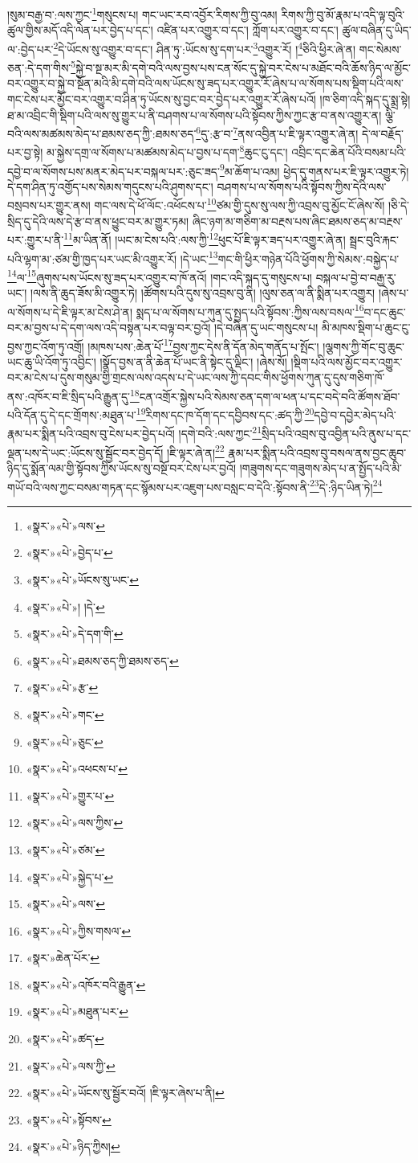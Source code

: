།སུམ་བརྒྱ་བ་:ལས་ཀྱང་\footnote{«སྣར་»«པེ་»ལས་}གསུངས་པ། གང་ཡང་རབ་འབྱོར་རིགས་ཀྱི་བུ་འམ། རིགས་ཀྱི་བུ་མོ་རྣམ་པ་འདི་ལྟ་བུའི་ཚུལ་གྱིས་མདོ་འདི་ལེན་པར་བྱེད་པ་དང་། འཛིན་པར་འགྱུར་བ་དང་། ཀློག་པར་འགྱུར་བ་དང་། ཚུལ་བཞིན་དུ་ཡིད་ལ་:བྱེད་པར་\footnote{«སྣར་»«པེ་»བྱེད་པ་}དེ་ཡོངས་སུ་འགྱུར་བ་དང་། ཤིན་ཏུ་:ཡོངས་སུ་དག་པར་\footnote{«སྣར་»«པེ་»ཡོངས་སུ་ཡང་}འགྱུར་རོ། །\footnote{«སྣར་»«པེ་»། །དེ་}ཅིའི་ཕྱིར་ཞེ་ན། གང་སེམས་ཅན་:དེ་དག་གིས་\footnote{«སྣར་»«པེ་»དེ་དག་གི་}སྐྱེ་བ་སྔ་མར་མི་དགེ་བའི་ལས་བྱས་པས་ངན་སོང་དུ་སྐྱེ་བར་ངེས་པ་མཐོང་བའི་ཆོས་ཉིད་ལ་མྱོང་བར་འགྱུར་བ་སྐྱེ་བ་སྔོན་མའི་མི་དགེ་བའི་ལས་ཡོངས་སུ་ཟད་པར་འགྱུར་རོ་ཞེས་པ་ལ་སོགས་པས་སྡིག་པའི་ལས་གང་ངེས་པར་མྱོང་བར་འགྱུར་བ་ཤིན་ཏུ་ཡོངས་སུ་བྱང་བར་བྱེད་པར་འགྱུར་རོ་ཞེས་པའོ། །ཁ་ཅིག་འདི་སྐད་དུ་སྨྲ་སྟེ། ཐ་མ་འབྲིང་གི་སྡིག་པའི་ལས་སུ་གྱུར་པ་ནི་བཤགས་པ་ལ་སོགས་པའི་སྟོབས་ཀྱིས་ཀྱང་རྩ་བ་ནས་འགྱུར་ན། ལྕི་བའི་ལས་མཚམས་མེད་པ་ཐམས་ཅད་ཀྱི་:ཐམས་ཅད་\footnote{«སྣར་»«པེ་»ཐམས་ཅད་ཀྱི་ཐམས་ཅད་}དུ་:རྩ་བ་\footnote{«སྣར་»«པེ་»རྩ་}ནས་འབྱིན་པ་ཇི་ལྟར་འགྱུར་ཞེ་ན། དེ་ལ་བརྗོད་པར་བྱ་སྟེ། མ་སྐྱེས་དགྲ་ལ་སོགས་པ་མཚམས་མེད་པ་བྱས་པ་དག་\footnote{«སྣར་»«པེ་»གང་}ཆུང་ངུ་དང་། འབྲིང་དང་ཆེན་པོའི་བསམ་པའི་དབྱེ་བ་ལ་སོགས་པས་མནར་མེད་པར་བསྐལ་པར་:ཅུང་ཟད་\footnote{«སྣར་»«པེ་»ཅུང་}མ་ཆོག་པ་འམ། ཕྱེད་དུ་གནས་པར་ཇི་ལྟར་འགྱུར་ཏེ། དེ་དག་ཤིན་ཏུ་འགྱོད་པས་སེམས་གདུངས་པའི་ཤུགས་དང་། བཤགས་པ་ལ་སོགས་པའི་སྟོབས་ཀྱིས་དེའི་ལས་བསྲབས་པར་གྱུར་ནས། གང་ལས་དེ་ཕོ་ལོང་:འཕོངས་པ་\footnote{«སྣར་»«པེ་»འཕངས་པ་}ཙམ་གྱི་དུས་སུ་ལས་ཀྱི་འབྲས་བུ་མྱོང་ངོ་ཞེས་སོ། །ཅི་དེ་སྲིད་དུ་དེའི་ལས་དེ་རྩ་བ་ནས་ཕྱུང་བར་མ་གྱུར་ཏམ། ཞིང་ཉག་མ་གཅིག་མ་བརྔས་པས་ཞིང་ཐམས་ཅད་མ་བརྔས་པར་:གྱུར་པ་ནི་\footnote{«སྣར་»«པེ་»གྱུར་པ་}མ་ཡིན་ནོ། །ཡང་མ་ངེས་པའི་:ལས་ཀྱི་\footnote{«སྣར་»«པེ་»ལས་ཀྱིས་}ཕུང་པོ་ཇི་ལྟར་ཟད་པར་འགྱུར་ཞེ་ན། སྦྲང་བུའི་རྐང་པའི་ལྷག་མ་:ཙམ་གྱི་ཁྱད་པར་ཡང་མི་འགྱུར་རོ། །དེ་ཡང་\footnote{«སྣར་»«པེ་»ཙམ་}གང་གི་ཕྱིར་གཉེན་པོའི་ཕྱོགས་ཀྱི་སེམས་:བསྐྱེད་པ་\footnote{«སྣར་»«པེ་»སྐྱེད་པ་}ལ་\footnote{«སྣར་»«པེ་»ལས་}ཞུགས་པས་ཡོངས་སུ་ཟད་པར་འགྱུར་བ་ཁོ་ནའོ། །གང་འདི་སྐད་དུ་གསུངས་པ། བསྐལ་པ་བྱེ་བ་བརྒྱ་རུ་ཡང་། །ལས་ནི་ཆུད་ཟོས་མི་འགྱུར་ཏེ། །ཚོགས་པའི་དུས་སུ་འབྲས་བུ་ནི། །ལུས་ཅན་ལ་ནི་སྨིན་པར་འགྱུར། །ཞེས་པ་ལ་སོགས་པ་དེ་ཇི་ལྟར་མ་ངེས་ཤེ་ན། སྨད་པ་ལ་སོགས་པ་ཀུན་དུ་སྤྱད་པའི་སྟོབས་:ཀྱིས་ལས་བསལ་\footnote{«སྣར་»«པེ་»ཀྱིས་གསལ་}བ་དང་ཆུང་བར་མ་བྱས་པ་དེ་དག་ལས་འདི་བསྟན་པར་བལྟ་བར་བྱའོ། །དེ་བཞིན་དུ་ཡང་གསུངས་པ། མི་མཁས་སྡིག་པ་ཆུང་ངུ་བྱས་ཀྱང་འོག་ཏུ་འགྲོ། །མཁས་པས་:ཆེན་པོ་\footnote{«སྣར་»ཆེན་པོར་}བྱས་ཀྱང་དེས་ནི་དོན་མེད་གནོད་པ་སྤོང་། །ལྕགས་ཀྱི་གོང་བུ་ཆུང་ཡང་ཆུ་ཡི་འོག་ཏུ་འབྱིང་། །སྣོད་བྱས་ན་ནི་ཆེན་པོ་ཡང་ནི་སྟེང་དུ་ལྡིང་། །ཞེས་སོ། །སྡིག་པའི་ལས་མྱོང་བར་འགྱུར་བར་མ་ངེས་པ་དུས་གསུམ་གྱི་གྲངས་ལས་འདས་པ་དེ་ཡང་ལས་ཀྱི་དབང་གིས་ཕྱོགས་ཀུན་དུ་དུས་གཅིག་ཁོ་ནས་:འཁོར་བ་ཇི་སྲིད་པའི་རྒྱུན་དུ་\footnote{«སྣར་»«པེ་»འཁོར་བའི་རྒྱུན་}ངན་འགྲོར་སྐྱེས་པའི་སེམས་ཅན་དག་ལ་ཕན་པ་དང་བདེ་བའི་ཚོགས་ཐོབ་པའི་དོན་དུ་དེ་དང་གྲོགས་:མཐུན་པ་\footnote{«སྣར་»«པེ་»མཐུན་པར་}རིགས་དང་ཁ་དོག་དང་དབྱིབས་དང་:ཚད་ཀྱི་\footnote{«སྣར་»«པེ་»ཚད་}དབྱེ་བ་དབྱེར་མེད་པའི་རྣམ་པར་སྨིན་པའི་འབྲས་བུ་ངེས་པར་བྱེད་པའོ། །དགེ་བའི་:ལས་ཀྱང་\footnote{«སྣར་»«པེ་»ལས་ཀྱི་}སྲིད་པའི་འབྲས་བུ་འབྱིན་པའི་ནུས་པ་དང་ལྡན་པས་དེ་ཡང་:ཡོངས་སུ་སྦྱོང་བར་བྱེད་དོ། །ཇི་ལྟར་ཞེ་ན།\footnote{«སྣར་»«པེ་»ཡོངས་སུ་སྦྱོར་བའོ། །ཇི་ལྟར་ཞེས་པ་ནི།} རྣམ་པར་སྨིན་པའི་འབྲས་བུ་བསལ་ནས་བྱང་ཆུབ་ཉིད་དུ་སྨོན་ལམ་གྱི་སྟོབས་ཀྱིས་ཡོངས་སུ་བསྔོ་བར་ངེས་པར་བྱའོ། །གཟུགས་དང་གཟུགས་མེད་པ་ན་སྤྱོད་པའི་མི་གཡོ་བའི་ལས་ཀྱང་བསམ་གཏན་དང་སྙོམས་པར་འཇུག་པས་བསླང་བ་དེའི་:སྟོབས་ནི་\footnote{«སྣར་»«པེ་»སྟོབས་}དེ་:ཉིད་ཡིན་ཏེ།\footnote{«སྣར་»«པེ་»ཉིད་ཀྱིས།} 
